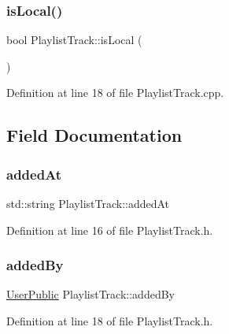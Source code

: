 \subsubsection{\texorpdfstring{is\+Local()}{isLocal()}}
{\footnotesize\ttfamily bool Playlist\+Track\+::is\+Local (\begin{DoxyParamCaption}{ }\end{DoxyParamCaption})}



Definition at line 18 of file Playlist\+Track.\+cpp.



\subsection{Field Documentation}
\mbox{\label{class_playlist_track_a030c354351b251c0f64b74d3aae053ea}} 
\subsubsection{\texorpdfstring{added\+At}{addedAt}}
{\footnotesize\ttfamily std\+::string Playlist\+Track\+::added\+At\hspace{0.3cm}{\ttfamily [private]}}



Definition at line 16 of file Playlist\+Track.\+h.

\mbox{\label{class_playlist_track_a735f9e2c7febfedd9d0c96e79c1d08c2}} 
\subsubsection{\texorpdfstring{added\+By}{addedBy}}
{\footnotesize\ttfamily \mbox{\hyperlink{class_user_public}{User\+Public}} Playlist\+Track\+::added\+By\hspace{0.3cm}{\ttfamily [private]}}



Definition at line 18 of file Playlist\+Track.\+h.

\mbox{\label{class_playlist_track_a0d58a78062e837bd33ce1821cff096d6}} 
